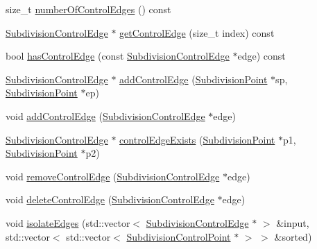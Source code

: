 \begin{DoxyCompactItemize}
\item 
size\+\_\+t \hyperlink{classShipCAD_1_1SubdivisionSurface_a1166213c5440962c118b688d1aa0aa28}{number\+Of\+Control\+Edges} () const 
\item 
\hyperlink{classShipCAD_1_1SubdivisionControlEdge}{Subdivision\+Control\+Edge} $\ast$ \hyperlink{classShipCAD_1_1SubdivisionSurface_ab25a7a80800de3a4c1eac65397ce25e0}{get\+Control\+Edge} (size\+\_\+t index) const 
\item 
bool \hyperlink{classShipCAD_1_1SubdivisionSurface_a8ad75a679b310394d5a3a6ca4f8262b9}{has\+Control\+Edge} (const \hyperlink{classShipCAD_1_1SubdivisionControlEdge}{Subdivision\+Control\+Edge} $\ast$edge) const 
\item 
\hyperlink{classShipCAD_1_1SubdivisionControlEdge}{Subdivision\+Control\+Edge} $\ast$ \hyperlink{classShipCAD_1_1SubdivisionSurface_a976358235d20a0fdc83248948bb9cf48}{add\+Control\+Edge} (\hyperlink{classShipCAD_1_1SubdivisionPoint}{Subdivision\+Point} $\ast$sp, \hyperlink{classShipCAD_1_1SubdivisionPoint}{Subdivision\+Point} $\ast$ep)
\item 
void \hyperlink{classShipCAD_1_1SubdivisionSurface_acfec50abf57a44ed47038ecc55f5a600}{add\+Control\+Edge} (\hyperlink{classShipCAD_1_1SubdivisionControlEdge}{Subdivision\+Control\+Edge} $\ast$edge)
\item 
\hyperlink{classShipCAD_1_1SubdivisionControlEdge}{Subdivision\+Control\+Edge} $\ast$ \hyperlink{classShipCAD_1_1SubdivisionSurface_a6a89be4440e3adfcb0b14c164db891ae}{control\+Edge\+Exists} (\hyperlink{classShipCAD_1_1SubdivisionPoint}{Subdivision\+Point} $\ast$p1, \hyperlink{classShipCAD_1_1SubdivisionPoint}{Subdivision\+Point} $\ast$p2)
\item 
void \hyperlink{classShipCAD_1_1SubdivisionSurface_a3aac4d6c8ad638234f88fb8b1ffa00cb}{remove\+Control\+Edge} (\hyperlink{classShipCAD_1_1SubdivisionControlEdge}{Subdivision\+Control\+Edge} $\ast$edge)
\item 
void \hyperlink{classShipCAD_1_1SubdivisionSurface_ae45fc2694977c8fbae54ac2e0e067d1f}{delete\+Control\+Edge} (\hyperlink{classShipCAD_1_1SubdivisionControlEdge}{Subdivision\+Control\+Edge} $\ast$edge)
\item 
void \hyperlink{classShipCAD_1_1SubdivisionSurface_a975c97ca338eb2aaaa3dcc0640611a95}{isolate\+Edges} (std\+::vector$<$ \hyperlink{classShipCAD_1_1SubdivisionControlEdge}{Subdivision\+Control\+Edge} $\ast$ $>$ \&input, std\+::vector$<$ std\+::vector$<$ \hyperlink{classShipCAD_1_1SubdivisionControlPoint}{Subdivision\+Control\+Point} $\ast$ $>$ $>$ \&sorted)

\end{DoxyCompactItemize}
